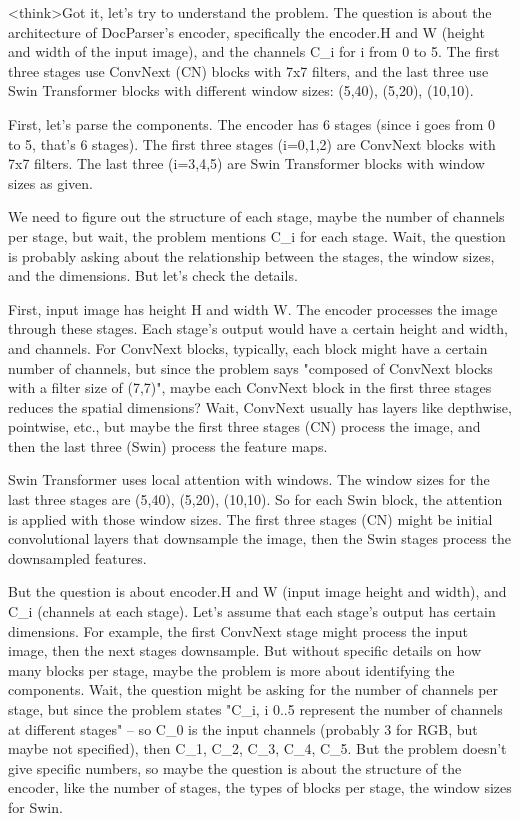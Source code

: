 <think>Got it, let's try to understand the problem. The question is about the architecture of DocParser's encoder, specifically the encoder.H and W (height and width of the input image), and the channels C_i for i from 0 to 5. The first three stages use ConvNext (CN) blocks with 7x7 filters, and the last three use Swin Transformer blocks with different window sizes: (5,40), (5,20), (10,10). 

First, let's parse the components. The encoder has 6 stages (since i goes from 0 to 5, that's 6 stages). The first three stages (i=0,1,2) are ConvNext blocks with 7x7 filters. The last three (i=3,4,5) are Swin Transformer blocks with window sizes as given. 

We need to figure out the structure of each stage, maybe the number of channels per stage, but wait, the problem mentions C_i for each stage. Wait, the question is probably asking about the relationship between the stages, the window sizes, and the dimensions. But let's check the details. 

First, input image has height H and width W. The encoder processes the image through these stages. Each stage's output would have a certain height and width, and channels. For ConvNext blocks, typically, each block might have a certain number of channels, but since the problem says "composed of ConvNext blocks with a filter size of (7,7)", maybe each ConvNext block in the first three stages reduces the spatial dimensions? Wait, ConvNext usually has layers like depthwise, pointwise, etc., but maybe the first three stages (CN) process the image, and then the last three (Swin) process the feature maps. 

Swin Transformer uses local attention with windows. The window sizes for the last three stages are (5,40), (5,20), (10,10). So for each Swin block, the attention is applied with those window sizes. The first three stages (CN) might be initial convolutional layers that downsample the image, then the Swin stages process the downsampled features. 

But the question is about encoder.H and W (input image height and width), and C_i (channels at each stage). Let's assume that each stage's output has certain dimensions. For example, the first ConvNext stage might process the input image, then the next stages downsample. But without specific details on how many blocks per stage, maybe the problem is more about identifying the components. Wait, the question might be asking for the number of channels per stage, but since the problem states "C_i, i 0..5 represent the number of channels at different stages" – so C_0 is the input channels (probably 3 for RGB, but maybe not specified), then C_1, C_2, C_3, C_4, C_5. But the problem doesn't give specific numbers, so maybe the question is about the structure of the encoder, like the number of stages, the types of blocks per stage, the window sizes for Swin. 

